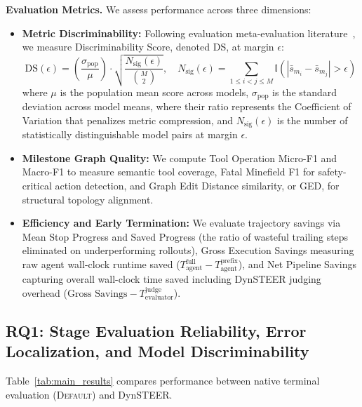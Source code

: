 \textbf{Evaluation Metrics.} We assess performance across three dimensions:
\begin{itemize}[leftmargin=*,itemsep=1.5pt,topsep=1pt]
    \item \textbf{Metric Discriminability:} Following evaluation meta-evaluation literature~\citep{sakai2006evaluating,sakai2014statistical,carterette2012multiple,zheng2023judging}, we measure Discriminability Score, denoted DS, at margin $\epsilon$:
    \begin{equation}
        \text{DS}(\epsilon) = \left( \frac{\sigma_{\text{pop}}}{\mu} \right) \cdot \sqrt{\frac{N_{\text{sig}}(\epsilon)}{\binom{M}{2}}}, \quad N_{\text{sig}}(\epsilon) = \sum_{1 \le i < j \le M} \mathbb{I}\left( |\bar{s}_{m_i} - \bar{s}_{m_j}| > \epsilon \right)
        \label{eq:ds}
    \end{equation}
    where $\mu$ is the population mean score across models, $\sigma_{\text{pop}}$ is the standard deviation across model means, where their ratio represents the Coefficient of Variation that penalizes metric compression, and $N_{\text{sig}}(\epsilon)$ is the number of statistically distinguishable model pairs at margin $\epsilon$.
    \item \textbf{Milestone Graph Quality:} We compute Tool Operation Micro-F1 and Macro-F1 to measure semantic tool coverage, Fatal Minefield F1 for safety-critical action detection, and Graph Edit Distance similarity, or GED, for structural topology alignment.
    \item \textbf{Efficiency and Early Termination:} We evaluate trajectory savings via Mean Stop Progress and Saved Progress (the ratio of wasteful trailing steps eliminated on underperforming rollouts), Gross Execution Savings measuring raw agent wall-clock runtime saved ($T_{\text{agent}}^{\text{full}} - T_{\text{agent}}^{\text{prefix}}$), and Net Pipeline Savings capturing overall wall-clock time saved including DynSTEER judging overhead ($\text{Gross Savings} - T_{\text{evaluator}}^{\text{judge}}$).
\end{itemize}

\subsection{RQ1: Stage Evaluation Reliability, Error Localization, and Model Discriminability}
\label{sec:exp_rq1}



Table~\ref{tab:main_results} compares performance between native terminal evaluation (\textsc{Default}) and DynSTEER.


